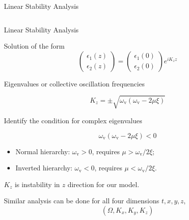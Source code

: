 \documentclass[9pt]{beamer}
\begin{document}
\begin{darkframes}
\begin{frame}{Linear Stability Analysis}
\begin{columns}[T]
\begin{column}{0.45\textwidth}
\end{column}


\end{columns}



\end{frame}


\begin{frame}{Linear Stability Analysis}


Solution of the form
\begin{equation*}
   \begin{pmatrix}
      \epsilon_1(z)\\
      \epsilon_2(z)
   \end{pmatrix} = \begin{pmatrix}
      \epsilon_1(0)\\
      \epsilon_2(0)
   \end{pmatrix} e^{i K_z z}
\end{equation*}


Eigenvalues or collective oscillation frequencies

\begin{equation*}
   K_z = \pm \sqrt{ \omega_{\mathrm v} ( \omega_{\mathrm v}- 2\mu \xi ) }
\end{equation*}

Identify the condition for complex eigenvalues

\begin{equation*}
   \omega_{\mathrm v} ( \omega_{\mathrm v}- 2\mu \xi ) < 0
\end{equation*}

\pause

\begin{itemize}
   \item Normal hierarchy: $\omega_{\mathrm v}>0$, requires $\mu  > \omega_{\mathrm v}/2 \xi$;
   \item Inverted hierarchy: $\omega_{\mathrm v}<0$, requires $\mu  < \omega_{\mathrm v}/2 \xi$.
\end{itemize}

\pause

\begin{tcolorbox}
    \center
    $K_z$ is instability in $z$ direction for our model.
\end{tcolorbox}

\pause

\begin{tcolorbox}
    \centering
    Similar analysis can be done for all four dimensions $t, x, y, z$,
    \begin{equation*}
        \left( \Omega, K_x, K_y, K_z \right)
    \end{equation*}


\end{tcolorbox}
\end{frame}
\end{darkframes}
\end{document}
